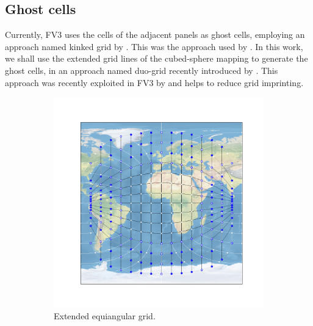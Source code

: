 \documentclass[preprint,12pt]{elsarticle}
\begin{document}
\begin{linenumbers}
\subsection{Ghost cells}
\label{cs-ghost}
Currently, FV3 uses the cells of the adjacent panels as ghost cells, employing an approach named kinked grid by \cite{mouallem:2023}. 
This was the approach used by \cite{putman:2007}.
In this work, we shall use the extended grid lines of the cubed-sphere mapping to generate the ghost cells, in an approach named duo-grid recently introduced by \citep{chen:2021}. This approach was recently exploited in FV3 by \cite{mouallem:2023} and helps to reduce grid imprinting.
\begin{figure}[!htb]
	\centering
	\begin{subfigure}{0.49\textwidth}
		\centering
		\includegraphics[width=1.13\linewidth]{g2_duo}
		\caption{Extended equiangular grid.\label{cs-duo-g2}}
	\end{subfigure}
	\begin{subfigure}{0.49\textwidth}
		\centering

\end{subfigure}
\end{figure}
\end{linenumbers}
\end{document}
